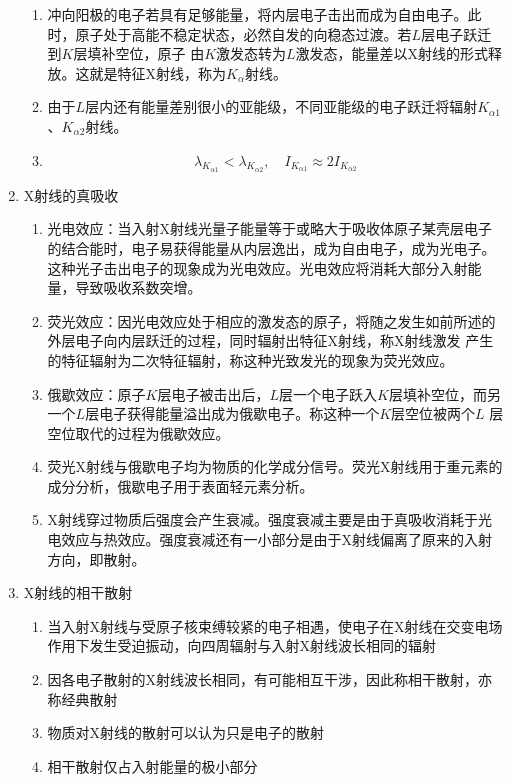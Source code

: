 \documentclass[12pt,a4paper]{article}
\begin{document}
\begin{enumerate}
\begin{enumerate}
            \item 冲向阳极的电子若具有足够能量，将内层电子击出而成为自由电子。此时，原子处于高能不稳定状态，必然自发的向稳态过渡。若$L$层电子跃迁到$K$层填补空位，原子
            由$K$激发态转为$L$激发态，能量差以X射线的形式释放。这就是特征X射线，称为$K_\alpha$射线。
            \item 由于$L$层内还有能量差别很小的亚能级，不同亚能级的电子跃迁将辐射$K_{\alpha1}$、$K_{\alpha2}$射线。
            \item $$\lambda_{K_{\alpha 1}}<\lambda_{K_{\alpha 2}}, \quad I_{K_{\alpha 1}} \approx 2 I_{K_{\alpha 2}}$$
        \end{enumerate}
        \item X射线的真吸收
        \begin{enumerate}
            \item 光电效应：当入射X射线光量子能量等于或略大于吸收体原子某壳层电子的结合能时，电子易获得能量从内层逸出，成为自由电子，成为光电子。
                这种光子击出电子的现象成为光电效应。光电效应将消耗大部分入射能量，导致吸收系数突增。
            \item 荧光效应：因光电效应处于相应的激发态的原子，将随之发生如前所述的外层电子向内层跃迁的过程，同时辐射出特征X射线，称X射线激发
                产生的特征辐射为二次特征辐射，称这种光致发光的现象为荧光效应。
            \item 俄歇效应：原子$K$层电子被击出后，$L$层一个电子跃入$K$层填补空位，而另一个$L$层电子获得能量溢出成为俄歇电子。称这种一个$K$层空位被两个$L$
                层空位取代的过程为俄歇效应。
            \item 荧光X射线与俄歇电子均为物质的化学成分信号。荧光X射线用于重元素的成分分析，俄歇电子用于表面轻元素分析。
            \item X射线穿过物质后强度会产生衰减。强度衰减主要是由于真吸收消耗于光电效应与热效应。强度衰减还有一小部分是由于X射线偏离了原来的入射方向，即散射。
        \end{enumerate}
        \item X射线的相干散射
        \begin{enumerate}
            \item 当入射X射线与受原子核束缚较紧的电子相遇，使电子在X射线在交变电场作用下发生受迫振动，向四周辐射与入射X射线波长相同的辐射
            \item 因各电子散射的X射线波长相同，有可能相互干涉，因此称相干散射，亦称经典散射
            \item 物质对X射线的散射可以认为只是电子的散射
            \item 相干散射仅占入射能量的极小部分

\end{enumerate}
\end{enumerate}
\end{document}
